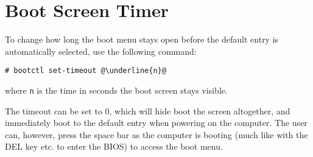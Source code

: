 \documentclass[a4paper]{article}
\begin{document}
\section{Boot Screen Timer}

To change how long the boot menu stays open before the default entry is automatically selected, use the following command:
\begin{lstlisting}[escapechar=@]
# bootctl set-timeout @\underline{n}@
\end{lstlisting}
where \lstinline|n| is the time in seconds the boot screen stays visible.

The timeout can be set to 0, which will hide boot the screen altogether, and immediately boot to the default entry when powering on the computer.
The user can, however, press the space bar as the computer is booting (much like with the DEL key etc. to enter the BIOS) to access the boot menu.




\end{document}
